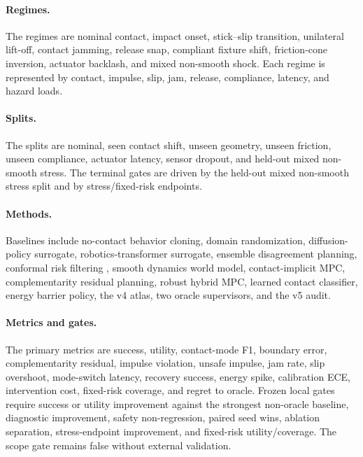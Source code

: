 \documentclass{article}
\begin{document}
\paragraph{Regimes.}
The regimes are nominal contact, impact onset, stick--slip transition, unilateral lift-off, contact jamming, release snap, compliant fixture shift, friction-cone inversion, actuator backlash, and mixed non-smooth shock. Each regime is represented by contact, impulse, slip, jam, release, compliance, latency, and hazard loads.

\paragraph{Splits.}
The splits are nominal, seen contact shift, unseen geometry, unseen friction, unseen compliance, actuator latency, sensor dropout, and held-out mixed non-smooth stress. The terminal gates are driven by the held-out mixed non-smooth stress split and by stress/fixed-risk endpoints.

\paragraph{Methods.}
Baselines include no-contact behavior cloning, domain randomization, diffusion-policy surrogate, robotics-transformer surrogate, ensemble disagreement planning, conformal risk filtering \citep{angelopoulos2021conformal,tibshirani2019conformal}, smooth dynamics world model, contact-implicit MPC, complementarity residual planning, robust hybrid MPC, learned contact classifier, energy barrier policy, the v4 atlas, two oracle supervisors, and the v5 audit.

\paragraph{Metrics and gates.}
The primary metrics are success, utility, contact-mode F1, boundary error, complementarity residual, impulse violation, unsafe impulse, jam rate, slip overshoot, mode-switch latency, recovery success, energy spike, calibration ECE, intervention cost, fixed-risk coverage, and regret to oracle. Frozen local gates require success or utility improvement against the strongest non-oracle baseline, diagnostic improvement, safety non-regression, paired seed wins, ablation separation, stress-endpoint improvement, and fixed-risk utility/coverage. The scope gate remains false without external validation.



\end{document}
